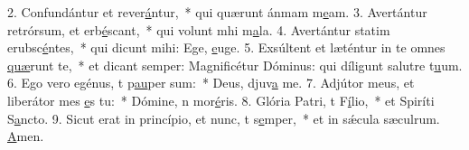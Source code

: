 2. Confundántur et rever\uline{á}ntur,~* qui quærunt ánmam m\uline{e}am.
3. Avertántur retrórsum, et erb\uline{é}scant,~* qui volunt mhi m\uline{a}la.
4. Avertántur statim erubsc\uline{é}ntes,~* qui dicunt mihi: Ege, \uline{e}uge.
5. Exsúltent et læténtur in te omnes  \uline{quæ}runt te,~* et dicant semper: Magnificétur Dóminus: qui díligunt salutre t\uline{u}um.
6. Ego vero egénus, t p\uline{au}per sum:~* Deus, djuv\uline{a} me.
7. Adjútor meus, et liberátor mes \uline{e}s tu:~* Dómine, n mor\uline{é}ris.
8. Glória Patri, t F\uline{í}lio,~* et Spiríti S\uline{a}ncto.
9. Sicut erat in princípio, et nunc, t s\uline{e}mper,~* et in sǽcula sæculrum. \uline{A}men.

